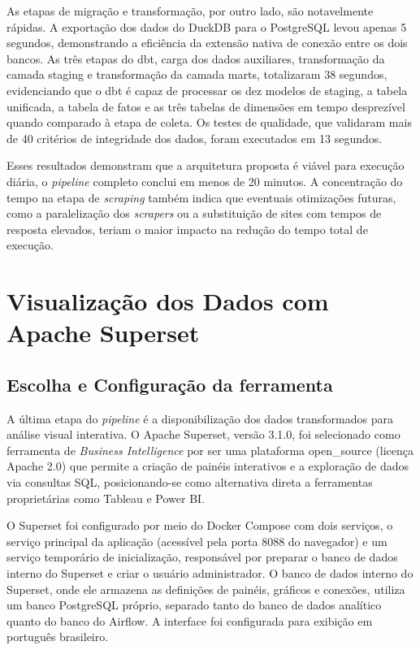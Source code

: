 As etapas de migração e transformação, por outro lado, são notavelmente rápidas. A exportação dos dados do DuckDB para o PostgreSQL levou apenas 5 segundos, demonstrando a eficiência da extensão nativa de conexão entre os dois bancos. As três etapas do dbt, carga dos dados auxiliares, transformação da camada staging e transformação da camada marts, totalizaram 38 segundos, evidenciando que o dbt é capaz de processar os dez modelos de staging, a tabela unificada, a tabela de fatos e as três tabelas de dimensões em tempo desprezível quando comparado à etapa de coleta. Os testes de qualidade, que validaram mais de 40 critérios de integridade dos dados, foram executados em 13 segundos.

Esses resultados demonstram que a arquitetura proposta é viável para execução diária, o \textit{pipeline} completo conclui em menos de 20 minutos. A concentração do tempo na etapa de \textit{scraping} também indica que eventuais otimizações futuras, como a paralelização dos \textit{scrapers} ou a substituição de sites com tempos de resposta elevados, teriam o maior impacto na redução do tempo total de execução.


\section{Visualização dos Dados com Apache Superset}
\subsection{Escolha e Configuração da ferramenta}

A última etapa do \textit{pipeline} é a disponibilização dos dados transformados para análise visual interativa. O Apache Superset, versão 3.1.0, foi selecionado como ferramenta de \textit{Business Intelligence} por ser uma plataforma \acs{open_source} (licença Apache 2.0) que permite a criação de painéis interativos e a exploração de dados via consultas SQL, posicionando-se como alternativa direta a ferramentas proprietárias como Tableau e Power BI.

O Superset foi configurado por meio do Docker Compose com dois serviços, o serviço principal da aplicação (acessível pela porta 8088 do navegador) e um serviço temporário de inicialização, responsável por preparar o banco de dados interno do Superset e criar o usuário administrador. O banco de dados interno do Superset, onde ele armazena as definições de painéis, gráficos e conexões, utiliza um banco PostgreSQL próprio, separado tanto do banco de dados analítico quanto do banco do Airflow. A interface foi configurada para exibição em português brasileiro.

